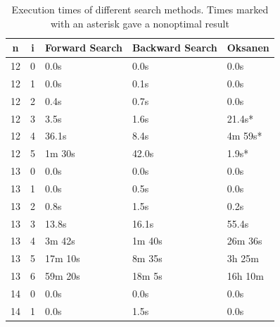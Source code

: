 \documentclass[10pt,journal,compsoc]{IEEEtran}
\begin{document}
\begin{table}[!t]
  \renewcommand{\arraystretch}{1.2}
  \caption{Execution times of different search methods. Times marked with an asterisk gave a nonoptimal result}
  \label{table:search_algorithms}
  \centering
  \begin{tabular}{c|c|l|l|l}
    \textbf{n} & \textbf{i} & \textbf{Forward Search} & \textbf{Backward Search} & \textbf{Oksanen} \\
    \hline
    12         & 0          & 0.0s                    & 0.0s                     & 0.0s             \\
    12         & 1          & 0.0s                    & 0.1s                     & 0.0s             \\
    12         & 2          & 0.4s                    & 0.7s                     & 0.0s             \\
    12         & 3          & 3.5s                    & 1.6s                     & 21.4s*           \\
    12         & 4          & 36.1s                   & 8.4s                     & 4m 59s*          \\
    12         & 5          & 1m 30s                  & 42.0s                    & 1.9s*            \\
    \hline
    13         & 0          & 0.0s                    & 0.0s                     & 0.0s             \\
    13         & 1          & 0.0s                    & 0.5s                     & 0.0s             \\
    13         & 2          & 0.8s                    & 1.5s                     & 0.2s             \\
    13         & 3          & 13.8s                   & 16.1s                    & 55.4s            \\
    13         & 4          & 3m 42s                  & 1m 40s                   & 26m 36s          \\
    13         & 5          & 17m 10s                 & 8m 35s                   & 3h 25m           \\
    13         & 6          & 59m 20s                 & 18m 5s                   & 16h 10m          \\
    \hline
    14         & 0          & 0.0s                    & 0.0s                     & 0.0s             \\
    14         & 1          & 0.0s                    & 1.5s                     & 0.0s             \\

\end{tabular}
\end{table}
\end{document}
